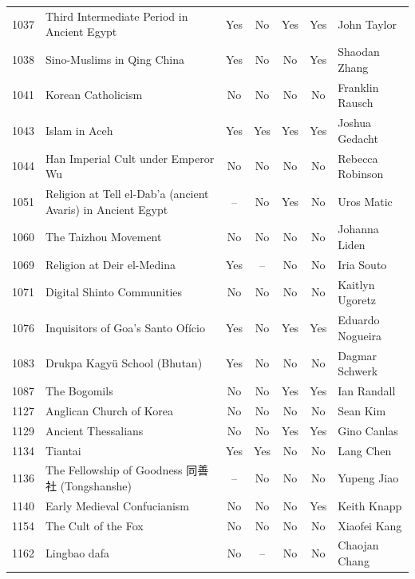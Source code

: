 {\begin{longtable}{rp{3.5cm}ccccp{3cm}}
1037 & {\raggedright Third Intermediate Period in Ancient Egypt} & Yes & No & Yes & Yes & {\raggedright John Taylor} \\
1038 & {\raggedright Sino-Muslims in Qing China} & Yes & No & No & Yes & {\raggedright Shaodan Zhang} \\
1041 & {\raggedright Korean Catholicism} & No & No & No & No & {\raggedright Franklin Rausch} \\
1043 & {\raggedright Islam in Aceh} & Yes & Yes & Yes & Yes & {\raggedright Joshua Gedacht} \\
1044 & {\raggedright Han Imperial Cult under Emperor Wu} & No & No & No & No & {\raggedright Rebecca Robinson} \\
1051 & {\raggedright Religion at Tell el-Dab'a (ancient Avaris) in Ancient Egypt} & -- & No & Yes & No & {\raggedright Uros Matic} \\
1060 & {\raggedright The Taizhou Movement} & No & No & No & No & {\raggedright Johanna Liden} \\
1069 & {\raggedright Religion at Deir el-Medina} & Yes & -- & No & No & {\raggedright Iria Souto} \\
1071 & {\raggedright Digital Shinto Communities} & No & No & No & No & {\raggedright Kaitlyn Ugoretz} \\
1076 & {\raggedright Inquisitors of Goa's Santo Ofício} & Yes & No & Yes & Yes & {\raggedright Eduardo Nogueira} \\
1083 & {\raggedright Drukpa Kagyü School (Bhutan)} & Yes & No & No & No & {\raggedright Dagmar Schwerk} \\
1087 & {\raggedright The Bogomils} & No & No & Yes & Yes & {\raggedright Ian Randall} \\
1127 & {\raggedright Anglican Church of Korea} & No & No & No & No & {\raggedright Sean Kim} \\
1129 & {\raggedright Ancient Thessalians} & No & No & Yes & Yes & {\raggedright Gino Canlas} \\
1134 & {\raggedright Tiantai} & Yes & Yes & No & No & {\raggedright Lang Chen} \\
1136 & {\raggedright The Fellowship of Goodness 同善社 (Tongshanshe)} & -- & No & No & No & {\raggedright Yupeng Jiao} \\
1140 & {\raggedright Early Medieval Confucianism} & No & No & No & Yes & {\raggedright Keith Knapp} \\
1154 & {\raggedright The Cult of the Fox} & No & No & No & No & {\raggedright Xiaofei Kang} \\
1162 & {\raggedright Lingbao dafa} & No & -- & No & No & {\raggedright Chaojan Chang} \\

\end{longtable}}
